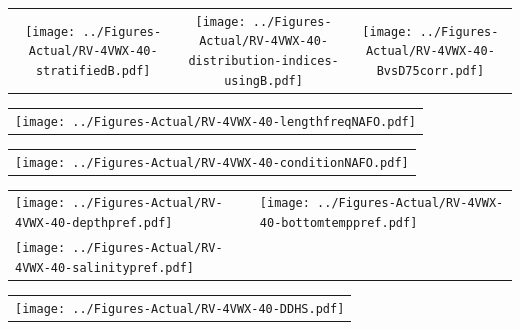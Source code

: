 \documentclass[12pt]{article}\usepackage[]{graphicx}\usepackage[]{color}
\begin{document}
\vspace{1cm}
\begin{minipage}{1.0\textwidth}
 \begin{tabular}{ccc}
\texttt{[image: ../Figures-Actual/RV-4VWX-40-stratifiedB.pdf]} & 
\texttt{[image: ../Figures-Actual/RV-4VWX-40-distribution-indices-usingB.pdf]} & 
\texttt{[image: ../Figures-Actual/RV-4VWX-40-BvsD75corr.pdf]} \\ 
\end{tabular} 
\end{minipage}
\clearpage
\begin{minipage}{1.0\textwidth}
 \begin{tabular}{c}
\texttt{[image: ../Figures-Actual/RV-4VWX-40-lengthfreqNAFO.pdf]} \\ 
\end{tabular} 
\end{minipage}
\newline

\vspace{1cm}
\begin{minipage}{1.0\textwidth}
 \begin{tabular}{c}
\texttt{[image: ../Figures-Actual/RV-4VWX-40-conditionNAFO.pdf]} \\ 
\end{tabular} 
\end{minipage}
\clearpage
\begin{minipage}{1.0\textwidth}
 \begin{tabular}[t]{m{3in}m{3in}}
\texttt{[image: ../Figures-Actual/RV-4VWX-40-depthpref.pdf]} & 
\texttt{[image: ../Figures-Actual/RV-4VWX-40-bottomtemppref.pdf]} \\ 
\texttt{[image: ../Figures-Actual/RV-4VWX-40-salinitypref.pdf]} & 
 \\ 
\end{tabular} 
\end{minipage}
\newline

\vspace{1cm}
\begin{minipage}{1.0\textwidth}
 \begin{tabular}{c}
\texttt{[image: ../Figures-Actual/RV-4VWX-40-DDHS.pdf]} \\ 
\end{tabular} 
\end{minipage}
\clearpage
\end{document}
